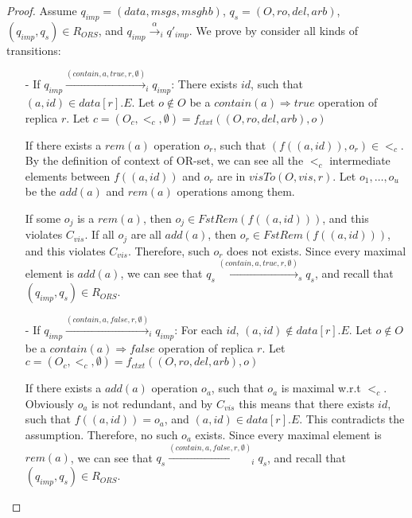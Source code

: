 \begin {proof}

Assume $q_{\mathit{imp}} = (\mathit{data},\mathit{msgs},\mathit{msghb})$, $q_s = (O,\mathit{ro},\mathit{del},\mathit{arb})$, $(q_{\mathit{imp}},q_s) \in R_{\mathit{ORS}}$, and $q_{\mathit{imp}} \xrightarrow{\alpha}_i q'_{\mathit{imp}}$. We prove by consider all kinds of transitions:

\begin{itemize}
\setlength{\itemsep}{0.5pt}
\item[-] If $q_{\mathit{imp}} \xrightarrow{( \mathit{contain},a,\mathit{true},r,\emptyset )}_i q_{\mathit{imp}}$: There exists $\mathit{id}$, such that $(a,id) \in \mathit{data}[r].E$. Let $o \notin O$ be a $\mathit{contain}(a) \Rightarrow \mathit{true}$ operation of replica $r$. Let $c = (O_c,<_c,\emptyset) = f_{\mathit{ctxt}}((O,\mathit{ro},\mathit{del},\mathit{arb}),o)$

If there exists a $\mathit{rem}(a)$ operation $o_r$, such that $(f((a,\mathit{id})),o_r) \in <_c$. By the definition of context of OR-set, we can see all the $<_c$ intermediate elements between $f((a,\mathit{id}))$ and $o_r$ are in $\mathit{visTo}(O,\mathit{vis},r)$. Let $o_1,\ldots,o_u$ be the $\mathit{add}(a)$ and $\mathit{rem}(a)$ operations among them.

If some $o_j$ is a $\mathit{rem}(a)$, then $o_j \in \mathit{FstRem}( f((a,\mathit{id})) )$, and this violates $C_{\mathit{vis}}$. If all $o_j$ are all $\mathit{add}(a)$, then $o_r \in \mathit{FstRem}( f((a,\mathit{id})) )$, and this violates $C_{\mathit{vis}}$. Therefore, such $o_r$ does not exists. Since every maximal element is $\mathit{add}(a)$, we can see that $q_s \xrightarrow{( \mathit{contain},a,\mathit{true},r,\emptyset )}_s q_s$, and recall that $(q_{\mathit{imp}},q_s) \in R_{\mathit{ORS}}$.

\item[-] If $q_{\mathit{imp}} \xrightarrow{( \mathit{contain},a,\mathit{false},r,\emptyset )}_i q_{\mathit{imp}}$: For each $\mathit{id}$, $(a,id) \notin \mathit{data}[r].E$. Let $o \notin O$ be a $\mathit{contain}(a) \Rightarrow \mathit{false}$ operation of replica $r$. Let $c = (O_c,<_c,\emptyset) = f_{\mathit{ctxt}}((O,\mathit{ro},\mathit{del},\mathit{arb}),o)$

If there exists a $\mathit{add}(a)$ operation $o_a$, such that $o_a$ is maximal w.r.t $<_c$. Obviously $o_a$ is not redundant, and by $C_{\mathit{vis}}$ this means that there exists $\mathit{id}$, such that $f((a,\mathit{id})) = o_a$, and $(a,\mathit{id}) \in \mathit{data}[r].E$. This contradicts the assumption. Therefore, no such $o_a$ exists. Since every  maximal element is $\mathit{rem}(a)$, we can see that $q_s \xrightarrow{( \mathit{contain},a,\mathit{false},r,\emptyset )}_i q_s$, and recall that $(q_{\mathit{imp}},q_s) \in R_{\mathit{ORS}}$. 


\end{itemize}
\end{proof}
